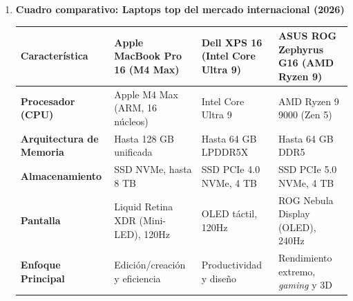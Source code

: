 \documentclass[10pt]{article}
\begin{document}
\begin{enumerate}
\begin{itemize}
        \item \textbf{NVIDIA (Unidades de Procesamiento de Datos - DPU):} A través de su arquitectura Mellanox, desarrollan sistemas de E/S de red avanzados (SmartNICs). Descargan el procesamiento de red, almacenamiento y seguridad de la CPU central hacia un procesador dedicado en la tarjeta de red, manejando anchos de banda masivos (hasta 400 Gb/s) para centros de datos.

        \item \textbf{Logitech (Periféricos de usuario final):} Líder en la interfaz humano-computadora. Sus sistemas de E/S integran conectividad inalámbrica de latencia ultrabaja (tecnología Lightspeed), sensores ópticos de alta precisión que funcionan sobre cristal y sistemas de carga electromagnética continua en periféricos de entrada.
    \end{itemize}


    \item \textbf{Cuadro comparativo: Laptops top del mercado internacional (2026)}

    \begin{center}
    \begin{tabular}{|p{3.2cm}|p{3.5cm}|p{3.5cm}|p{3.5cm}|}
        \hline
        \textbf{Característica} &
        \textbf{Apple MacBook Pro 16 (M4 Max)} &
        \textbf{Dell XPS 16 (Intel Core Ultra 9)} &
        \textbf{ASUS ROG Zephyrus G16 (AMD Ryzen 9)} \\
        \hline

        \textbf{Procesador (CPU)} &
        Apple M4 Max (ARM, 16 núcleos) &
        Intel Core Ultra 9 &
        AMD Ryzen 9 9000 (Zen 5) \\
        \hline

        \textbf{Arquitectura de Memoria} &
        Hasta 128 GB unificada &
        Hasta 64 GB LPDDR5X &
        Hasta 64 GB DDR5 \\
        \hline

        \textbf{Almacenamiento} &
        SSD NVMe, hasta 8 TB &
        SSD PCIe 4.0 NVMe, 4 TB &
        SSD PCIe 5.0 NVMe, 4 TB \\
        \hline

        \textbf{Pantalla} &
        Liquid Retina XDR (Mini-LED), 120Hz &
        OLED táctil, 120Hz &
        ROG Nebula Display (OLED), 240Hz \\
        \hline

        \textbf{Enfoque Principal} &
        Edición/creación y eficiencia &
        Productividad y diseño &
        Rendimiento extremo, \textit{gaming} y 3D \\
        \hline
    \end{tabular}
    \end{center}



\end{enumerate}
\end{document}
